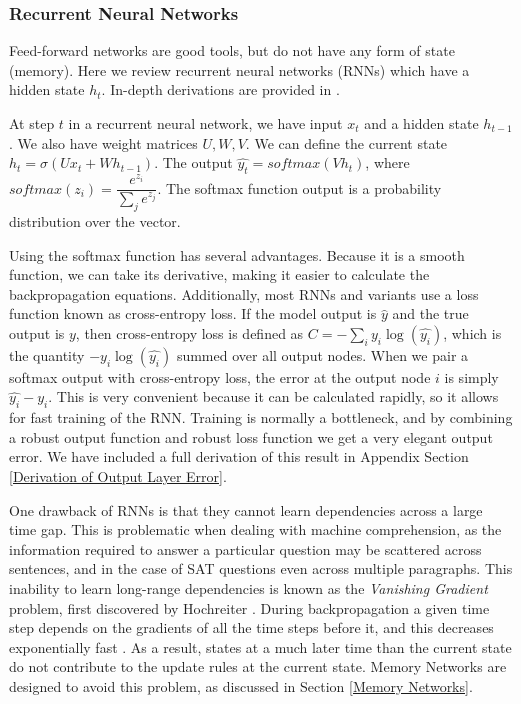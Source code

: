 \documentclass[pageno]{final_paper}
\begin{document}
\subsubsection{Recurrent Neural Networks}
\label{Recurrent Neural Networks}

Feed-forward networks are good tools, but do not have any form of state
(memory). Here we review recurrent neural networks (RNNs) which have a hidden
state $h_t$. In-depth derivations are provided in \cite{Britz2015}.

At step $t$ in a recurrent neural network, we have input $x_t$ and a hidden
state $h_{t-1}$. We also have weight matrices $U, W, V$. We can define the
current state $h_t = \sigma(Ux_t + Wh_{t-1})$.  The output $\hat{y_t} =
softmax(Vh_t)$, where $softmax(z_i) = \dfrac{e^{z_i}}{\sum_j e^{z_j}}$. The
softmax function output is a probability distribution over the vector.

Using the softmax function has several advantages. Because it is a smooth
function, we can take its derivative, making it easier to calculate the
backpropagation equations. Additionally, most RNNs and variants use a loss
function known as cross-entropy loss. If the model output is $\hat{y}$ and the
true output is $y$, then cross-entropy loss is defined as $C = -\sum_i y_i
\log(\hat{y_{i}})$, which is the quantity $-y_i\log(\hat{y_i})$ summed over all
output nodes. When we pair a softmax output with cross-entropy loss, the error
at the output node $i$ is simply $\hat{y_i} - y_i$. This is very convenient
because it can be calculated rapidly, so it allows for fast training of the RNN.
Training is normally a bottleneck, and by combining a robust output function and
robust loss function we get a very elegant output error. We have included a full
derivation of this result in Appendix Section \ref{Derivation of Output Layer
Error}.

One drawback of RNNs is that they cannot learn dependencies across a large time
gap. This is problematic when dealing with machine comprehension, as the
information required to answer a particular question may be scattered across
sentences, and in the case of SAT questions even across multiple paragraphs.
This inability to learn long-range dependencies is known as the
\textit{Vanishing Gradient} problem, first discovered by Hochreiter
\cite{Hochreiter1991}. During backpropagation a given time step depends on the
gradients of all the time steps before it, and this decreases exponentially fast
\cite{Britz2015}. As a result, states at a much later time than the current
state do not contribute to the update rules at the current state. Memory
Networks are designed to avoid this problem, as discussed in Section \ref{Memory
Networks}.
\end{document}
